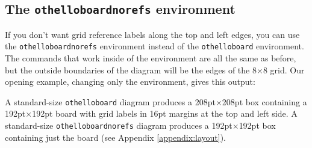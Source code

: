 \documentclass[a4paper,12pt]{article}
\begin{document}
\subsection{The \texttt{othelloboardnorefs} environment}
\label{norefs}
If you don't want grid reference labels along the top and left edges, you can use the \verb=othelloboardnorefs= environment instead of the \verb=othelloboard= environment. The commands that work inside of the environment are all the same as before, but the outside boundaries of the diagram will be the edges of the 8$\times$8 grid. Our opening example, changing only the environment, gives this output:

\begin{minipage}[t]{196pt}
\vspace{0pt}
\begin{othelloboardnorefs}{1}
\dotmarkings
{}
\end{othelloboardnorefs}
\end{minipage}
\begin{minipage}[t]{360pt}
\vspace{12pt}
\begin{small}
\begin{verbatimtab}
\begin{othelloboardnorefs}{1}
\dotmarkings
{}
\end{othelloboardnorefs}
\end{verbatimtab}
\end{small}
\end{minipage}

A standard-size \verb=othelloboard= diagram produces a 208pt$\times$208pt box containing a 192pt$\times$192pt board with grid labels in 16pt margins at the top and left side. A standard-size \verb=othelloboardnorefs= diagram produces a 192pt$\times$192pt box containing just the board (see Appendix \ref{appendix:layout}).
\end{document}
